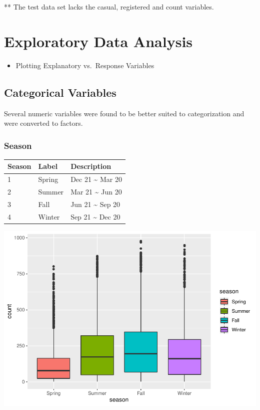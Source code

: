 \documentclass[american,]{article}
\providecommand{\tightlist}{%
  \setlength{\itemsep}{0pt}\setlength{\parskip}{0pt}}
\begin{document}
** The test data set lacks the casual, registered and count variables.

\newpage

\hypertarget{exploratory-data-analysis}{%
\section{Exploratory Data Analysis}\label{exploratory-data-analysis}}

\begin{itemize}
\tightlist
\item
  Plotting Explanatory vs.~Response Variables
\end{itemize}

\hypertarget{categorical-variables}{%
\subsection{Categorical Variables}\label{categorical-variables}}

Several numeric variables were found to be better suited to categorization and were converted to factors.

\hypertarget{season}{%
\subsubsection{Season}\label{season}}

\begin{longtable}[]{@{}lll@{}}
\toprule
Season & Label & Description\tabularnewline
\midrule
\endhead
1 & Spring & Dec 21 \textasciitilde{} Mar 20\tabularnewline
2 & Summer & Mar 21 \textasciitilde{} Jun 20\tabularnewline
3 & Fall & Jun 21 \textasciitilde{} Sep 20\tabularnewline
4 & Winter & Sep 21 \textasciitilde{} Dec 20\tabularnewline
\bottomrule
\end{longtable}

\includegraphics{BikeSharingDemand_files/figure-latex/train.mod.1.season-1.pdf}
\end{document}
